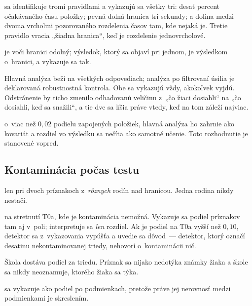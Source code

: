 \begin{description}[leftmargin=0.6cm, nosep]
    \item[\textbf{Rýchle hádanie}] sa identifikuje tromi pravidlami a vykazujú sa
    všetky tri: desať percent očakávaného času položky; pevná dolná hranica tri
    sekundy; a dolina medzi dvoma vrcholmi pozorovaného rozdelenia časov tam, kde
    nejaká je. Tretie pravidlo vracia „žiadna hranica“, keď je rozdelenie
    jednovrcholové.
    \item[\textbf{Výsledok platný pri všetkých troch}] je voči hranici odolný;
    výsledok, ktorý sa objaví pri jednom, je výsledkom o~hranici, a vykazuje sa
    tak.
    \item[\textbf{Odpovede sa neodstraňujú.}] Hlavná analýza beží na všetkých
    odpovediach; analýza po filtrovaní úsilia je deklarovaná robustnostná
    kontrola. Obe sa vykazujú vždy, akokoľvek vyjdú. Odstránenie by ticho zmenilo
    odhadovanú veličinu z~„čo žiaci dosiahli“ na „čo dosiahli, keď sa snažili“, a
    tie dve sa líšia práve vtedy, keď na tom záleží najviac.
    \item[\textbf{Ak sa úsilie medzi podmienkami líši}] o~viac než $0{,}02$
    podielu zapojených položiek, hlavná analýza ho zahrnie ako kovariát a rozdiel
    vo výsledku sa nečíta ako samotné učenie. Toto rozhodnutie je stanovené
    vopred.
\end{description}

\subsection{Kontaminácia počas testu}

\begin{description}[leftmargin=0.6cm, nosep]
    \item[\textbf{Vylúčenie}] len pri dvoch príznakoch z~\emph{rôznych} rodín nad
    hranicou. Jedna rodina nikdy nestačí.
    \item[\textbf{Kalibrácia}] na stretnutí T0a, kde je kontaminácia nemožná.
    Vykazuje sa podiel príznakov tam aj v~poli; interpretuje sa \emph{len}
    rozdiel. Ak je podiel na T0a vyšší než $0{,}10$, detektor sa z~vykazovania
    vypúšťa a uvedie sa dôvod~--- detektor, ktorý označí desatinu nekontaminovanej
    triedy, nehovorí o~kontaminácii nič.
    \item[\textbf{Žiadne mená.}] Škola dostáva podiel za triedu. Príznak sa nijako
    nedotýka známky žiaka a škole sa nikdy neoznamuje, ktorého žiaka sa týka.
    \item[\textbf{Diferenciálna kontaminácia}] sa vykazuje ako podiel po
    podmienkach, pretože práve jej nerovnosť medzi podmienkami je skreslením.
\end{description}

